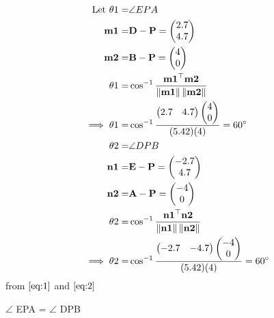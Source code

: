 \documentclass[10pt]{article}
\newcommand{\myvec}[1]{\ensuremath{\begin{pmatrix}#1\end{pmatrix}}}
\providecommand{\norm}[1]{\left\lVert#1\right\rVert}
\let\vec\mathbf{}
\begin{document}
\begin{align}
\text{ Let  }\theta1=&\angle EPA\\
\vec{m1}=&\vec{D}-\vec{P}=\myvec{2.7\\4.7}\\
\vec{m2}=&\vec{B}-\vec{P}=\myvec{4\\0}\\
\theta1=&\cos^{-1}\frac{\vec{m1}^\top\vec{m2}}{\norm{\vec{m1}}\norm{\vec{m2}}}\\
\implies\theta1=&\cos^{-1}\frac{\myvec{2.7&4.7}\myvec{4\\0}}{(5.42)(4)}=60\degree
\label{eq:1}\\
\theta2=&\angle DPB\\
	\vec{n1}=&\vec{E}-\vec{P}=\myvec{-2.7\\4.7}\\
\vec{n2}=&\vec{A}-\vec{P}=\myvec{-4\\0}\\
\theta2 =& \cos^{-1}\frac{\vec{n1}^\top\vec{n2}}{\norm{\vec{n1}}\norm{\vec{n2}}}\\
\implies\theta2=&\cos^{-1}\frac{\myvec{-2.7&-4.7}\myvec{-4\\0}}{(5.42)(4)}=60\degree
	\label{eq:2}
\end{align}
from $\eqref{eq:1}$ and $\eqref{eq:2}$
\begin{center}
$\angle$ EPA = $\angle$ DPB
\end{center}
\end{document}
